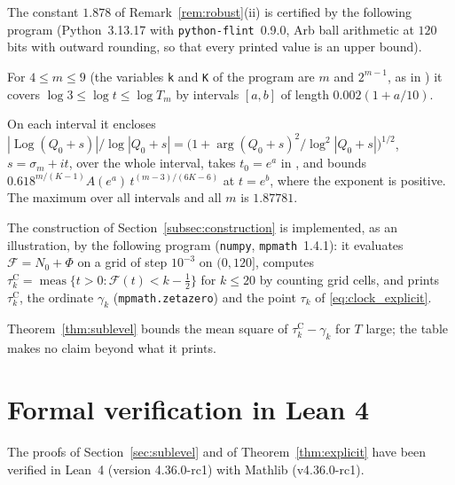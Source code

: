 \documentclass[11pt,a4paper]{article}
\makeatletter
\numberwithin{equation}{section}
\DeclareRobustCommand{\CGref}[1]{\ref{#1}}
\DeclareRobustCommand{\CGeqref}[1]{\eqref{#1}}
\DeclareRobustCommand{\CGcite}[2][]{\if\relax\detokenize{#1}\relax\cite{#2}\else\cite[#1]{#2}\fi}
\let\CG@origref\ref
\let\CG@origeqref\eqref
\newcommand{\CG@gettip}[1]{\@ifundefined{CGTip@#1}{#1}{\csname CGTip@#1\endcsname}}
\newcommand{\CG@getbib}[1]{\@ifundefined{CGBib@#1}{#1}{\csname CGBib@#1\endcsname}}
\DeclareRobustCommand{\CGref}[1]{\pdftooltip{\CG@origref{#1}}{\CG@gettip{#1}}}
\DeclareRobustCommand{\CGeqref}[1]{\pdftooltip{\CG@origeqref{#1}}{\CG@gettip{#1}}}
\DeclareRobustCommand{\CGcite}[2][]{\pdftooltip{\if\relax\detokenize{#1}\relax\cite{#2}\else\cite[#1]{#2}\fi}{\CG@getbib{#2}}}
\theoremstyle{definition}
\theoremstyle{remark}
\newcommand{\Nz}{N_0} %
\newcommand{\Fc}{\mathcal F}
\newcommand{\Ph}{\Phi}
\newcommand{\meas}{\operatorname{meas}}
\makeatother
\begin{document}




The constant $1.878$ of Remark~\CGref{rem:robust}(ii) is certified by the following program (Python~3.13.17 with \texttt{python-flint}~0.9.0, Arb ball arithmetic at $120$ bits with outward rounding, so that every printed value is an upper bound).

For $4\le m\le9$ (the variables \texttt{k} and \texttt{K} of the program are $m$ and $2^{m-1}$, as in \CGcite[\S3]{Yang2024}) it covers $\log3\le\log t\le\log T_m$ by intervals $[a,b]$ of length $0.002(1+a/10)$.

On each interval it encloses $|\operatorname{Log}(Q_0+s)|/\log|Q_0+s|=\bigl(1+\arg(Q_0+s)^2/\log^2|Q_0+s|\bigr)^{1/2}$, $s=\sigma_m+it$, over the whole interval, takes $t_0=e^a$ in \CGcite[(3.12)]{Yang2024}, and bounds $0.618^{m/(K-1)}A(e^a)\,t^{(m-3)/(6K-6)}$ at $t=e^b$, where the exponent is positive. The maximum over all intervals and all $m$ is $1.87781$.





The construction of Section~\CGref{subsec:construction} is implemented, as an illustration, by the following program (\texttt{numpy}, \texttt{mpmath}~1.4.1): it evaluates $\Fc=\Nz+\Ph$ on a grid of step $10^{-3}$ on $(0,120]$, computes $\tau_{k}^{\mathrm C}=\meas\{t>0:\Fc(t)<k-\frac12\}$ for $k\le20$ by counting grid cells, and prints $\tau_{k}^{\mathrm C}$, the ordinate $\gamma_k$ (\texttt{mpmath.zetazero}) and the point $\tau_k$ of \CGeqref{eq:clock_explicit}.

Theorem~\CGref{thm:sublevel} bounds the mean square of $\tau_{k}^{\mathrm C}-\gamma_k$ for $T$ large; the table makes no claim beyond what it prints.





\section{Formal verification in Lean 4}\label{app:lean}
The proofs of Section~\CGref{sec:sublevel} and of Theorem~\CGref{thm:explicit} have been verified in Lean~4 (version 4.36.0-rc1) with Mathlib (v4.36.0-rc1).
\end{document}
